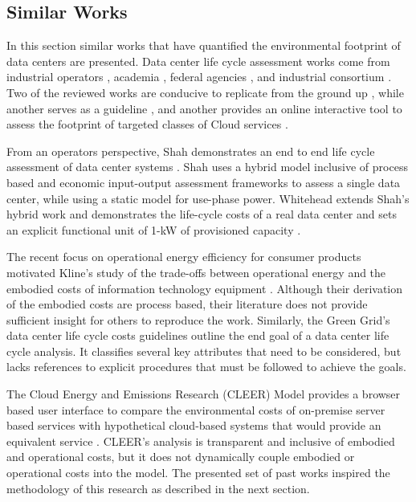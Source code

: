     \subsection{Similar Works}
        In this section similar works that have quantified the environmental footprint of data centers are presented. Data center life cycle assessment works come from industrial operators \cite{shah11},  academia \cite{whitehead15,kline16}, federal agencies \cite{CLEER13}, and industrial consortium \cite{tgg12}. Two of the reviewed works are conducive to replicate from the ground up \cite{shah11,whitehead15}, while another serves as a guideline \cite{tgg12}, and another provides an online interactive tool to assess the footprint of targeted classes of Cloud services \cite{CLEER13}. 

        From an operators perspective, Shah demonstrates an end to end life cycle assessment of data center systems \cite{shah11}. Shah uses a hybrid model inclusive of process based and economic input-output assessment frameworks to assess a single data center, while using a static model for use-phase power. Whitehead extends Shah's hybrid work and demonstrates the life-cycle costs of a real data center and sets an explicit functional unit of 1-kW of provisioned capacity \cite{whitehead15}.  
        
        The recent focus on operational energy efficiency for consumer products motivated Kline’s study of the trade-offs between operational energy and the embodied costs of information technology equipment \cite{kline16}. Although their derivation of the embodied costs are process based, their literature does not provide sufficient insight for others to reproduce the work. Similarly, the Green Grid's data center life cycle costs guidelines outline the end goal of a data center life cycle analysis. It classifies several key attributes that need to be considered, but lacks references to explicit procedures that must be followed to achieve the goals. 
        
       The Cloud Energy and Emissions Research (CLEER) Model provides a browser based user interface to compare the environmental costs of on-premise server based services with hypothetical cloud-based systems that would provide an equivalent service \cite{CLEER13}. CLEER's analysis is transparent and inclusive of embodied and operational costs, but it does not dynamically couple embodied or operational costs into the model. The presented set of past works inspired the methodology of this research as described in the next section.

